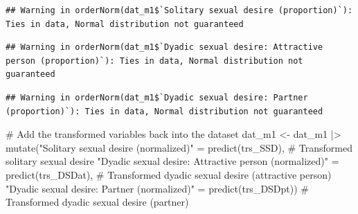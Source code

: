 \documentclass[
  bookmarksnumbered]{article}
\newenvironment{Shaded}{\begin{snugshade}}{\end{snugshade}}
\newcommand{\AttributeTok}[1]{\textcolor[rgb]{0.80,0.80,0.80}{#1}}
\newcommand{\CommentTok}[1]{\textcolor[rgb]{0.50,0.62,0.50}{#1}}
\newcommand{\FunctionTok}[1]{\textcolor[rgb]{0.94,0.94,0.56}{#1}}
\newcommand{\NormalTok}[1]{\textcolor[rgb]{0.80,0.80,0.80}{#1}}
\newcommand{\OtherTok}[1]{\textcolor[rgb]{0.94,0.94,0.56}{#1}}
\newcommand{\SpecialCharTok}[1]{\textcolor[rgb]{0.86,0.64,0.64}{#1}}
\newcommand{\StringTok}[1]{\textcolor[rgb]{0.80,0.58,0.58}{#1}}
\begin{document}
\begin{verbatim}
## Warning in orderNorm(dat_m1$`Solitary sexual desire (proportion)`): Ties in data, Normal distribution not guaranteed
\end{verbatim}

\begin{Shaded}
\end{Shaded}

\begin{verbatim}
## Warning in orderNorm(dat_m1$`Dyadic sexual desire: Attractive person (proportion)`): Ties in data, Normal distribution not guaranteed
\end{verbatim}

\begin{Shaded}
\end{Shaded}

\begin{verbatim}
## Warning in orderNorm(dat_m1$`Dyadic sexual desire: Partner (proportion)`): Ties in data, Normal distribution not guaranteed
\end{verbatim}

\begin{Shaded}
\begin{Highlighting}[]
\CommentTok{\# Add the transformed variables back into the dataset  }
\NormalTok{dat\_m1 }\OtherTok{\textless{}{-}}\NormalTok{ dat\_m1 }\SpecialCharTok{|\textgreater{}}  
  \FunctionTok{mutate}\NormalTok{(}\StringTok{"Solitary sexual desire (normalized)"} \OtherTok{=} 
           \FunctionTok{predict}\NormalTok{(trs\_SSD),  }\CommentTok{\# Transformed solitary sexual desire  }
         \StringTok{"Dyadic sexual desire: Attractive person (normalized)"} \OtherTok{=} 
           \FunctionTok{predict}\NormalTok{(trs\_DSDat),  }\CommentTok{\# Transformed dyadic sexual desire (attractive person)  }
         \StringTok{"Dyadic sexual desire: Partner (normalized)"} \OtherTok{=} 
           \FunctionTok{predict}\NormalTok{(trs\_DSDpt))  }\CommentTok{\# Transformed dyadic sexual desire (partner)  }
\end{Highlighting}
\end{Shaded}
\end{document}
